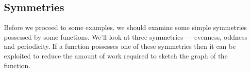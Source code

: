 %
%
%
%
%


\subsection{Symmetries}\label{ssec_sketch_SYM}
Before we proceed to some examples, we should examine some simple symmetries possessed by
some functions. We'll look at three symmetries --- evenness, oddness and periodicity.
If a function possesses one of these symmetries then it can be exploited to reduce the
amount of work required to sketch the graph of the function.

